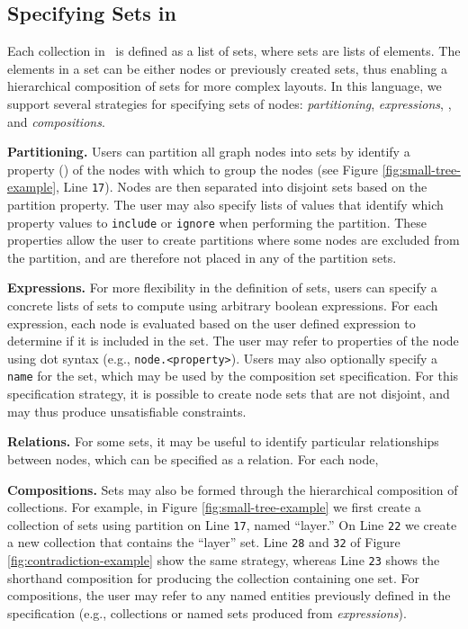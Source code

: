 \subsection{Specifying Sets in \projectname}
Each collection in \projectname\ is defined as a list of sets, where sets are lists of elements. The elements in a set can be either nodes or previously created sets, thus enabling a hierarchical composition of sets for more complex layouts. In this language, we support several strategies for specifying sets of nodes: \emph{partitioning}, \emph{expressions}, , and \emph{compositions}.

\textbf{Partitioning.} Users can partition all graph nodes into sets by identify a property () of the nodes with which to group the nodes (see Figure \ref{fig:small-tree-example}, Line \texttt{17}). Nodes are then separated into disjoint sets based on the partition property. The user may also specify lists of values that identify which property values to \texttt{include} or \texttt{ignore} when performing the partition. These properties allow the user to create partitions where some nodes are excluded from the partition, and are therefore not placed in any of the partition sets.

\textbf{Expressions.} For more flexibility in the definition of sets, users can specify a concrete lists of sets to compute using arbitrary boolean expressions. For each expression, each node is evaluated based on the user defined expression to determine if it is included in the set. The user may refer to properties of the node using dot syntax (e.g., \texttt{node.<property>}). Users may also optionally specify a \texttt{name} for the set, which may be used by the composition set specification. For this specification strategy, it is possible to create node sets that are not disjoint, and may thus produce unsatisfiable constraints. 

\textbf{Relations.} For some sets, it may be useful to identify particular relationships between nodes, which can be specified as a relation. For each node, 

\contradictionExample

\textbf{Compositions.} Sets may also be formed through the hierarchical composition of collections. For example, in Figure \ref{fig:small-tree-example} we first create a collection of sets using partition on Line \texttt{17}, named ``layer.'' On Line \texttt{22} we create a new collection that contains the ``layer'' set. Line \texttt{28} and \texttt{32} of Figure \ref{fig:contradiction-example} show the same strategy, whereas Line \texttt{23} shows the shorthand composition for producing the collection containing one set. For compositions, the user may refer to any named entities previously defined in the specification (e.g., collections or named sets produced from \emph{expressions}).

